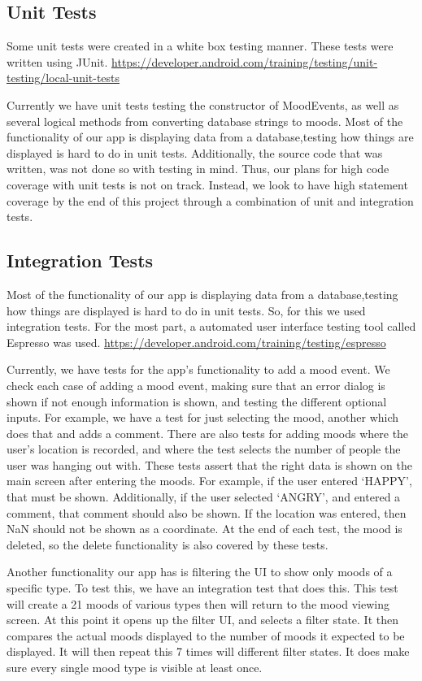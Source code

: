 \subsection{Unit Tests}
Some unit tests were created in a white box testing manner.
These tests were written using JUnit.
\url{https://developer.android.com/training/testing/unit-testing/local-unit-tests}

Currently we have unit tests testing the constructor of MoodEvents, as well as several logical methods from converting database strings to moods. Most of the functionality of our app is displaying data from a database,testing how things are displayed is hard to do in unit tests. Additionally, the source code that was written, was not done so with testing in mind. Thus, our plans for high code coverage with unit tests is not on track. Instead, we look to have high statement coverage by the end of this project through a combination of unit and integration tests. 


\subsection{Integration Tests}

Most of the functionality of our app is displaying data from a database,testing how things are displayed is hard to do in unit tests.
So, for this we used integration tests. For the most part, a automated user interface testing
tool called Espresso was used.
\url{https://developer.android.com/training/testing/espresso}

Currently, we have tests for the app's functionality to add a mood event.
We check each case of adding a mood event, making sure that an error
dialog is shown if not enough information is shown, and testing the
different optional inputs. For example, we have a test for just selecting
the mood, another which does that and adds a comment. There are also tests
for adding moods where the user's location is recorded, and where the test
selects the number of people the user was hanging out with.
These tests assert that the right data is shown on the main screen
after entering the moods. For example, if the user entered `HAPPY', that
must be shown. Additionally, if the user selected `ANGRY', and entered
a comment, that comment should also be shown. If the location was entered,
then NaN should not be shown as a coordinate. At the end of each test, the mood is deleted, so the delete functionality
is also covered by these tests.

Another functionality our app has is filtering the UI to show only moods of a
specific type. To test this, we have an integration test that does this. This
test will create a 21 moods of various types then will return to the mood
viewing screen. At this point it opens up the filter UI, and selects a filter
state. It then compares the actual moods displayed to the number of moods it
expected to be displayed. It will then repeat this 7 times will different
filter states. It does make sure every single mood type is visible at least
once.


